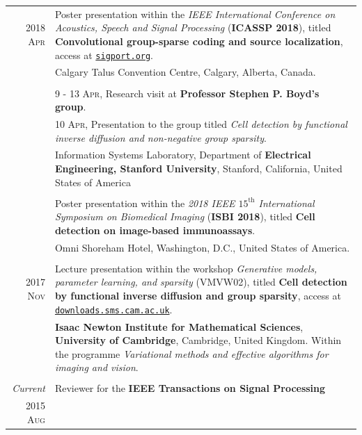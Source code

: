 \documentclass[a4paper,10pt]{article}
\begin{document}
\begin{longtable}[H]{r|p{13.5cm}}
      \textsc{2018 Apr} & Poster presentation within the \emph{IEEE International Conference 
			  on Acoustics, Speech and Signal Processing} (\textbf{ICASSP 2018}), titled
			  \textbf{Convolutional group-sparse coding and source localization}, access at \href{https://sigport.org/documents/convolutional-group-sparse-coding-and-source-localization}{\texttt{sigport.org}}. \\
			& \footnotesize{Calgary Talus Convention Centre, Calgary, Alberta, Canada.} \\
			& \\
			& \textsc{9 - 13 Apr}, Research visit at \textbf{Professor Stephen P. Boyd's group}. \\
			& \textsc{10 Apr}, Presentation to the group titled 
              \emph{Cell detection by functional inverse diffusion and non-negative group sparsity}.\\
			& \footnotesize{Information Systems Laboratory, Department of \textbf{Electrical Engineering, 
			  Stanford University}, Stanford, California, United States of America} \\
			& \\
			& Poster presentation within the \emph{2018 IEEE $15^{\mathrm{th}}$ International
			  Symposium on Biomedical Imaging} (\textbf{ISBI 2018}), titled
			  \textbf{Cell detection on image-based immunoassays}.\\
			& \footnotesize{Omni Shoreham Hotel, Washington, D.C., United States of America.} \\
      \multicolumn{2}{c}{} \\
      
      \textsc{2017 Nov} & Lecture presentation within the workshop \emph{Generative models, 
			  parameter learning, and sparsity} (VMVW02), titled
			  \textbf{Cell detection by functional inverse diffusion and group sparsity},
			  access at \href{https://downloads.sms.cam.ac.uk/2600830/2600858.mp4}{\texttt{downloads.sms.cam.ac.uk}}. \\
			& \footnotesize{\textbf{Isaac Newton Institute for Mathematical Sciences},
			  \textbf{University of Cambridge}, Cambridge, United Kingdom.
			  Within the programme \emph{Variational methods and effective
			  algorithms for imaging and vision}.}\\
      \multicolumn{2}{c}{} \\
      
      \emph{Current}	& Reviewer for the \textbf{IEEE Transactions on Signal Processing} \\
      \textsc{2015 Aug} &  \\
      
    \end{longtable}
  
\end{document}
